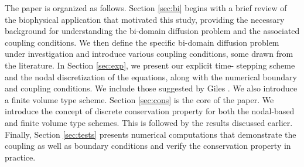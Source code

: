 The paper is organized as follows. Section \ref{sec:bi} begins with a 
brief review of the biophysical application that motivated this study, providing the necessary background for understanding the bi-domain diffusion problem and 
the associated coupling conditions. We then define the specific bi-domain diffusion problem under investigation and introduce various coupling 
conditions, some drawn from the literature. In Section \ref{sec:exp}, we present our explicit time-
stepping scheme and the nodal discretization of the equations, along with the numerical boundary and coupling conditions. 
We include those suggested by 
Giles \cite{GIL}. We also introduce a finite volume type scheme. Section \ref{sec:cons} is the core of the paper. We introduce the concept of discrete conservation property for both the nodal-based and finite volume type schemes. This is followed by the results discussed earlier. Finally, Section \ref{sec:tests} presents numerical computations that demonstrate the coupling as well as boundary conditions and verify the conservation property in practice.
